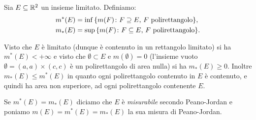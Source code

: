 \begin{definition}
\label{def:peano-jordan}%
%
%
%
%
%
Sia $E\subseteq {\mathbb R}^2$ un insieme limitato. Definiamo:
\begin{align*}
m^*(E) &= \inf{\left\{ m(F)\colon \text{$F\supseteq E$, $F$ polirettangolo} \right\}}, \\
m_*(E) &= \sup{\left\{ m(F)\colon \text{$F\subseteq E$, $F$ polirettangolo} \right\}}.
\end{align*}

Visto che $E$ è limitato (dunque è contenuto in un rettangolo limitato)
si ha $m^*(E)<+\infty$ e visto che $\emptyset \subset E$
e $m(\emptyset)=0$ (l'insieme vuoto $\emptyset = (a,a) \times (c,c)$ è un
polirettangolo di area nulla) si ha $m_*(E)\ge 0$. Inoltre $m_*(E)\le m^*(E)$
in quanto ogni polirettangolo contenuto in $E$ è contenuto, e quindi ha area non superiore, 
ad ogni polirettangolo contenente $E$.

Se $m^*(E) = m_*(E)$ diciamo che $E$ è \emph{misurabile}%
%
 secondo Peano-Jordan
e poniamo $m(E) = m^*(E) = m_*(E)$ la sua misura di Peano-Jordan.
\end{definition}

